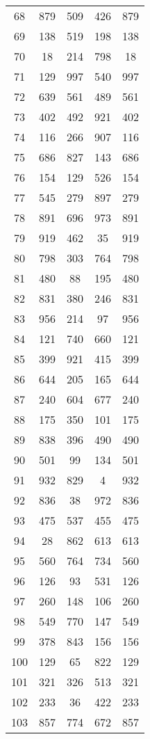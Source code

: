 \documentclass[a4paper,10pt,ngerman]{scrartcl}
\begin{document}
\begin{longtable}[c]{c|c|c|c|c}
    68 & 879 & 509 & 426 & 879 \\
    69 & 138 & 519 & 198 & 138 \\
    70 & 18 & 214 & 798 & 18 \\
    71 & 129 & 997 & 540 & 997 \\
    72 & 639 & 561 & 489 & 561 \\
    73 & 402 & 492 & 921 & 402 \\
    74 & 116 & 266 & 907 & 116 \\
    75 & 686 & 827 & 143 & 686 \\
    76 & 154 & 129 & 526 & 154 \\
    77 & 545 & 279 & 897 & 279 \\
    78 & 891 & 696 & 973 & 891 \\
    79 & 919 & 462 & 35 & 919 \\
    80 & 798 & 303 & 764 & 798 \\
    81 & 480 & 88 & 195 & 480 \\
    82 & 831 & 380 & 246 & 831 \\
    83 & 956 & 214 & 97 & 956 \\
    84 & 121 & 740 & 660 & 121 \\
    85 & 399 & 921 & 415 & 399 \\
    86 & 644 & 205 & 165 & 644 \\
    87 & 240 & 604 & 677 & 240 \\
    88 & 175 & 350 & 101 & 175 \\
    89 & 838 & 396 & 490 & 490 \\
    90 & 501 & 99 & 134 & 501 \\
    91 & 932 & 829 & 4 & 932 \\
    92 & 836 & 38 & 972 & 836 \\
    93 & 475 & 537 & 455 & 475 \\
    94 & 28 & 862 & 613 & 613 \\
    95 & 560 & 764 & 734 & 560 \\
    96 & 126 & 93 & 531 & 126 \\
    97 & 260 & 148 & 106 & 260 \\
    98 & 549 & 770 & 147 & 549 \\
    99 & 378 & 843 & 156 & 156 \\
    100 & 129 & 65 & 822 & 129 \\
    101 & 321 & 326 & 513 & 321 \\
    102 & 233 & 36 & 422 & 233 \\
    103 & 857 & 774 & 672 & 857 \\

\end{longtable}
\end{document}
